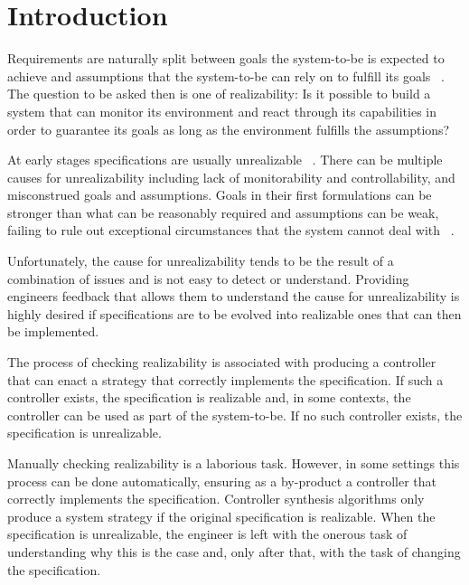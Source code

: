 \section{Introduction}\label{sec:introduction}


Requirements are naturally split between goals the system-to-be is expected to achieve and
assumptions that the system-to-be can rely on to fulfill its goals ~\cite{Jackson:1995,Letier:2002}. The question to be asked then is one of realizability: Is it possible to build a system that can monitor its environment and react through its capabilities in order to guarantee its goals as long as the environment fulfills the assumptions?

At early stages specifications are usually unrealizable ~\cite{Letier:2002}. There can be 
multiple causes for unrealizability including lack of monitorability and controllability, 
and misconstrued goals and assumptions. Goals in their first formulations can  be 
stronger than what can be reasonably required and assumptions can be weak, failing to 
rule out exceptional circumstances that the system cannot deal with 
~\cite{vanLamsweerde:2000}. 

Unfortunately, the cause for unrealizability tends to be the result of a combination of issues and is not easy to detect or understand. Providing engineers feedback that allows them to understand the cause for unrealizability is highly desired if specifications are to be evolved into realizable ones that can then be implemented. 

The process of checking realizability is associated with producing a controller that can 
enact a strategy that correctly implements the specification. If such a controller exists, 
the specification is realizable and, in some contexts, the controller can be used as part of 
the system-to-be. If no such controller exists, the specification is unrealizable. 

Manually checking realizability is a laborious task. However, in some settings this 
process can be done automatically, ensuring as a by-product a controller  that correctly 
implements the specification.  Controller synthesis algorithms only produce a system 
strategy if the original specification is realizable. When the specification is unrealizable, 
the engineer is left with the onerous task of understanding why this is the case and, only 
after that, with the task of changing the specification.

